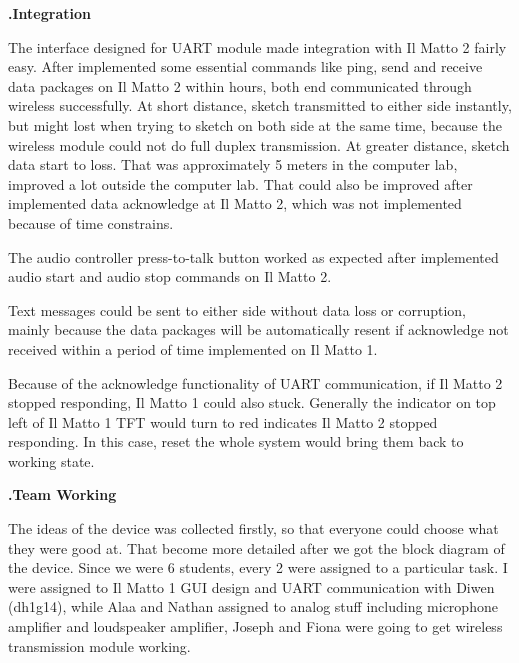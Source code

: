 \documentclass[a4paper,notitlepage,10pt]{report}
\newcommand{\tab}{\hspace{0.75cm}}
\newcommand{\fontHeading}{\fontsize{12pt}{13.2pt}\selectfont}
\newcommand{\fontSubHeading}{\fontsize{10pt}{11pt}\selectfont}
\newcommand{\fontBody}{\fontsize{10pt}{11pt}\selectfont}
\newcounter{sections}
\newcounter{subsections}[sections]
\begin{document}
\begin{multicols}{2}
\fontSubHeading
{}
\textbf{\thesections.\thesubsections\tab Integration}
\vspace{6pt}

\fontBody
The interface designed for UART module made integration with Il Matto 2 fairly easy. After implemented some essential commands like ping, send and receive data packages on Il Matto 2 within hours, both end communicated through wireless successfully. At short distance, sketch transmitted to either side instantly, but might lost when trying to sketch on both side at the same time, because the wireless module could not do full duplex transmission. At greater distance, sketch data start to loss. That was approximately 5 meters in the computer lab, improved a lot outside the computer lab. That could also be improved after implemented data acknowledge at Il Matto 2, which was not implemented because of time constrains.
\vspace{6pt}

The audio controller press-to-talk button worked as expected after implemented audio start and audio stop commands on Il Matto 2.
\vspace{6pt}

Text messages could be sent to either side without data loss or corruption, mainly because the data packages will be automatically resent if acknowledge not received within a period of time implemented on Il Matto 1.
\vspace{6pt}

Because of the acknowledge functionality of UART communication, if Il Matto 2 stopped responding, Il Matto 1 could also stuck. Generally the indicator on top left of Il Matto 1 TFT would turn to red indicates Il Matto 2 stopped responding. In this case, reset the whole system would bring them back to working state.
\vspace{10pt}

\fontHeading
{}
\textbf{\thesections.\tab Team Working}
\vspace{10pt}

\fontBody
The ideas of the device was collected firstly, so that everyone could choose what they were good at. That become more detailed after we got the block diagram of the device. Since we were 6 students, every 2 were assigned to a particular task. I were assigned to Il Matto 1 GUI design and UART communication with Diwen (dh1g14), while Alaa and Nathan assigned to analog stuff including microphone amplifier and loudspeaker amplifier, Joseph and Fiona were going to get wireless transmission module working.
\vspace{6pt}


\end{multicols}
\end{document}
